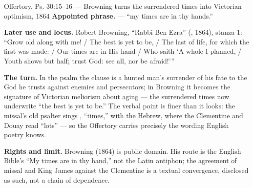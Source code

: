 \begin{afterlife}{Offertory, Ps. 30:15--16 --- Browning turns the surrendered times into Victorian optimism, 1864}
\textbf{Appointed phrase.}  --- ``my times
are in thy hands.''

\textbf{Later use and locus.} Robert Browning, ``Rabbi Ben Ezra''
(, 1864), stanza 1: ``Grow old along with me! / The
best is yet to be, / The last of life, for which the first was made: / Our
times are in His hand / Who saith `A whole I planned, / Youth shows but half;
trust God: see all, nor be afraid!'''

\textbf{The turn.} In the psalm the clause is a hunted man's surrender of his
fate to the God he trusts against enemies and persecutors; in Browning it
becomes the signature of Victorian meliorism about aging --- the surrendered
times now underwrite ``the best is yet to be.'' The verbal point is finer
than it looks: the missal's old psalter sings , ``times,''
with the Hebrew, where the Clementine and Douay read ``lots'' --- so the
Offertory carries precisely the wording English poetry knows.

\textbf{Rights and limit.} Browning (1864) is public domain. His route is the
English Bible's ``My times are in thy hand,'' not the Latin antiphon; the
agreement of missal and King James against the Clementine is a textual
convergence, disclosed as such, not a chain of dependence.
\end{afterlife}
